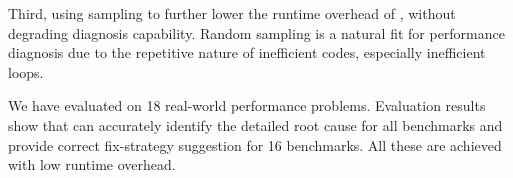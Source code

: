 Third, using sampling to further lower the runtime overhead of \Tool, without
degrading diagnosis capability. Random sampling is a natural fit for performance
diagnosis due to the repetitive nature of inefficient codes, especially
inefficient loops.

We have evaluated \Tool on 18 real-world performance problems. 
Evaluation results show that \Tool can accurately identify the detailed
root cause for all benchmarks and provide correct fix-strategy suggestion for
16 benchmarks. All these are achieved with low runtime overhead.
